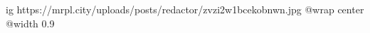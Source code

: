  
 
 
 
 

\ifcmt
  ig https://mrpl.city/uploads/posts/redactor/zvzi2w1bcekobnwn.jpg
  @wrap center
  @width 0.9
\fi
